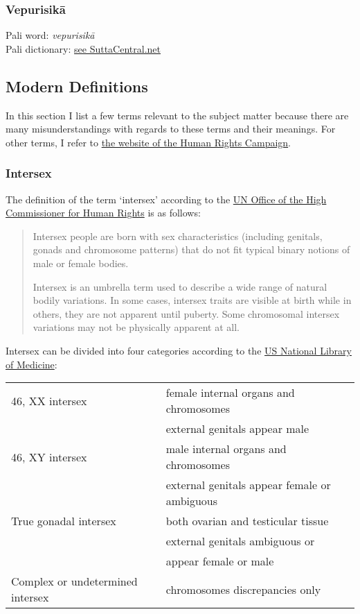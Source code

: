 \subsubsection*{Vepurisikā}

Pali word: {\em vepurisikā}\\
Pali dictionary: \href{https://suttacentral.net/define/vepurisik%C4%81}{see SuttaCentral.net}


\subsection{Modern Definitions}
In this section I list a few terms relevant to the subject matter because there are many misunderstandings with regards to these terms and their meanings. For other terms, I refer to \href{https://www.hrc.org/resources/glossary-of-terms}{the website of the Human Rights Campaign}.

\subsubsection*{Intersex}
\label{intersex}

The definition of the term `intersex' according to the \href{https://unfe.org/system/unfe-65-Intersex_Factsheet_ENGLISH.pdf}{UN Office of the High Commissioner for Human Rights} is as follows:

\begin{quote}
Intersex people are born with sex characteristics (including genitals, gonads and chromosome patterns) that do not fit typical binary notions of male or female bodies.

Intersex is an umbrella term used to describe a wide range of natural bodily variations. In some cases, intersex traits are visible at birth while in others, they are not apparent until puberty. Some chromosomal intersex variations may not be physically apparent at all.
\end{quote}

Intersex can be divided into four categories according to the \href{https://medlineplus.gov/ency/article/001669.htm}{US National Library of Medicine}:

\begin{tabular}{ l l }
46, XX intersex & female internal organs and chromosomes\\
& external genitals appear male\\
46, XY intersex & male internal organs and chromosomes\\
& external genitals appear female or ambiguous\\
True gonadal intersex & both ovarian and testicular tissue\\
& external genitals ambiguous or\\
& appear female or male\\
Complex or undetermined intersex & chromosomes discrepancies only\\
\end{tabular}

